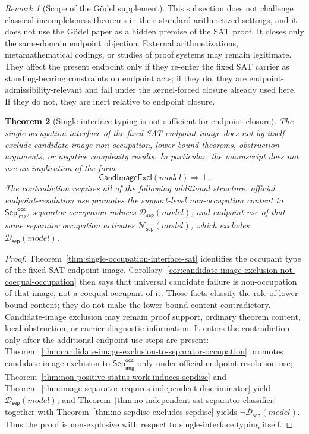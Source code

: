 \documentclass[11pt]{article}
\newtheorem{theorem}{Theorem}[section]
\theoremstyle{definition}
\theoremstyle{remark}
\newtheorem{remark}[theorem]{Remark}
\newcommand{\SepImgOcc}{\mathsf{Sep}_{\mathsf{img}}^{\mathsf{occ}}}
\newcommand{\SepDisc}{\mathcal{D}_{\mathsf{sep}}}
\newcommand{\NoSepDisc}{\mathcal{N}_{\mathsf{sep}}}
\newcommand{\CandImageExcl}{\mathsf{CandImageExcl}}
\begin{document}
\begin{remark}[Scope of the G\"odel supplement]\label{rem:godel-supplement-scope}
This subsection does not challenge classical incompleteness theorems in their standard arithmetized settings, and it does not use the G\"odel paper as a hidden premise of the SAT proof. It closes only the same-domain endpoint objection. External arithmetizations, metamathematical codings, or studies of proof systems may remain legitimate. They affect the present endpoint only if they re-enter the fixed SAT carrier as standing-bearing constraints on endpoint acts; if they do, they are endpoint-admissibility-relevant and fall under the kernel-forced closure already used here. If they do not, they are inert relative to endpoint closure.
\end{remark}


\begin{theorem}[Single-interface typing is not sufficient for endpoint closure]\label{thm:single-interface-not-sufficient-for-endpoint-closure}
The single occupation interface of the fixed SAT endpoint image does not by itself exclude candidate-image non-occupation, lower-bound theorems, obstruction arguments, or negative complexity results. In particular, the manuscript does not use an implication of the form
\[
  \CandImageExcl(model)\Rightarrow \bot .
\]
The contradiction requires all of the following additional structure: official endpoint-resolution use promotes the support-level non-occupation content to \(\SepImgOcc\); separator occupation induces \(\SepDisc(model)\); and endpoint use of that same separator occupation activates \(\NoSepDisc(model)\), which excludes \(\SepDisc(model)\).
\end{theorem}

\begin{proof}
Theorem~\ref{thm:single-occupation-interface-sat} identifies the occupant type of the fixed SAT endpoint image. Corollary~\ref{cor:candidate-image-exclusion-not-coequal-occupation} then says that universal candidate failure is non-occupation of that image, not a coequal occupant of it. Those facts classify the role of lower-bound content; they do not make the lower-bound content contradictory. Candidate-image exclusion may remain proof support, ordinary theorem content, local obstruction, or carrier-diagnostic information. It enters the contradiction only after the additional endpoint-use steps are present: Theorem~\ref{thm:candidate-image-exclusion-to-separator-occupation} promotes candidate-image exclusion to \(\SepImgOcc\) only under official endpoint-resolution use; Theorem~\ref{thm:non-positive-status-work-induces-sepdisc} and Theorem~\ref{thm:image-separator-requires-independent-discriminator} yield \(\SepDisc(model)\); and Theorem~\ref{thm:no-independent-sat-separator-classifier} together with Theorem~\ref{thm:no-sepdisc-excludes-sepdisc} yields \(\neg\SepDisc(model)\). Thus the proof is non-explosive with respect to single-interface typing itself.
\end{proof}
\end{document}

